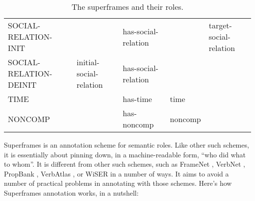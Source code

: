 \documentclass[a4paper]{article}
\newcommand{\fr}[1]{\textsf{#1}}
\newcommand{\rl}[1]{\textsf{#1}}
\begin{document}
\begin{table}
{\begin{tabular}{lllll}
            \fr{SOCIAL-RELATION-INIT} & & \rl{has-social-relation} & & \rl{target-social-relation} \\
            \fr{SOCIAL-RELATION-DEINIT} & \rl{initial-social-relation} & \rl{has-social-relation} & & \\
            \fr{TIME} & & \rl{has-time} & \rl{time} & \\
            \midrule
            \fr{NONCOMP} & & \rl{has-noncomp} & \rl{noncomp} \\
            \bottomrule
        \end{tabular}
    }
    \caption{The superframes and their roles.}
    \label{tab:superframes}
\end{table}

Superframes is an annotation scheme for semantic roles. Like other such
schemes, it is essentially about pinning down, in a machine-readable form,
``who did what to whom''. It is different from other such schemes, such as
FrameNet \citep{baker-etal-1998-berkeley}, VerbNet
\citep{kipper-schuler-2005-verbnet}, PropBank
\citep{palmer-etal-2005-proposition}, VerbAtlas
\citep{di-fabio-etal-2019-verbatlas}, or WiSER \citep{feng-etal-2022-widely} in
a number of ways. It aims to avoid a number of practical problems in annotating
with those schemes. Here's how Superframes annotation works, in a nutshell:
\end{document}
